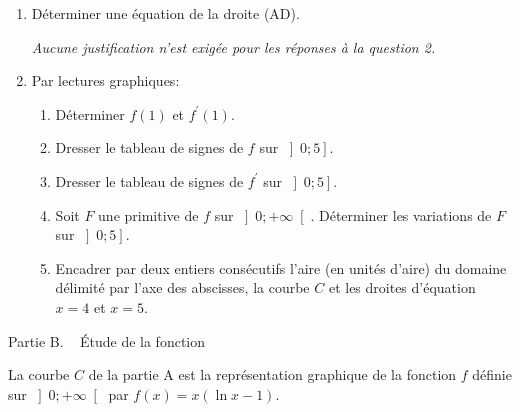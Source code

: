 \begin{center}
\end{center}
\begin{enumerate}
     \item
     Déterminer une équation de la droite (AD).

\textit{Aucune justification n'est exigée pour les réponses à la question 2. }

\item
Par lectures graphiques:
\begin{enumerate}[label=\alph*.]
     \item
     Déterminer $f\left(1\right)$ et $f^{\prime}\left(1\right)$.
     \item
     Dresser le tableau de signes de $f$ sur $\left]0 ; 5\right]$.
     \item
     Dresser le tableau de signes de $f^{\prime}$ sur $\left]0 ; 5\right]$.
     \item
     Soit $F$ une primitive de $f$ sur $\left]0 ; +\infty \right[$. Déterminer les variations de $F$ sur $\left]0 ; 5\right]$.
     \item
     Encadrer par deux entiers consécutifs l'aire (en unités d'aire) du domaine délimité par l'axe des abscisses, la courbe $C$ et les droites d'équation $x=4$ et $x=5$.
\end{enumerate}
\end{enumerate}
\begin{h3}Partie B. ~ Étude de la fonction\end{h3}
La courbe $C$ de la partie A est la représentation graphique de la fonction $f$ définie sur $\left]0 ; +\infty \right[$ par $f\left(x\right)=x \left(\ln x -1\right)$.

